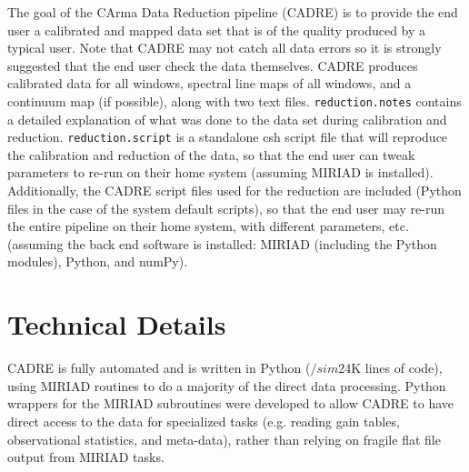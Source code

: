The goal of the CArma Data Reduction pipeline (CADRE) is to provide the end user a calibrated and mapped data set that is of the quality produced by a typical user. Note that CADRE may not catch all data errors so it is strongly suggested that the end user check the data themselves. CADRE produces calibrated data for all windows, spectral line maps of all windows, and a continuum map (if possible), along with two text files. \verb#reduction.notes# contains a detailed explanation of what was done to the data set during calibration and reduction. \verb#reduction.script# is a standalone csh script file that will reproduce the calibration and reduction of the data, so that the end user can tweak parameters to re-run on their home system (assuming MIRIAD \citep{stw95} is installed). Additionally, the CADRE script files used for the reduction are included (Python files in the case of the system default scripts), so that the end user may re-run the entire pipeline on their home system, with different parameters, etc. (assuming the back end software is installed: MIRIAD (including the Python modules), Python, and numPy).

\section{Technical Details}

CADRE is fully automated and is written in Python ($/sim$24K lines of code), using MIRIAD routines to do a majority of the direct data processing. Python wrappers for the MIRIAD subroutines were developed to allow CADRE to have direct access to the data for specialized tasks (e.g. reading gain tables, observational statistics, and meta-data), rather than relying on fragile flat file output from MIRIAD tasks.

